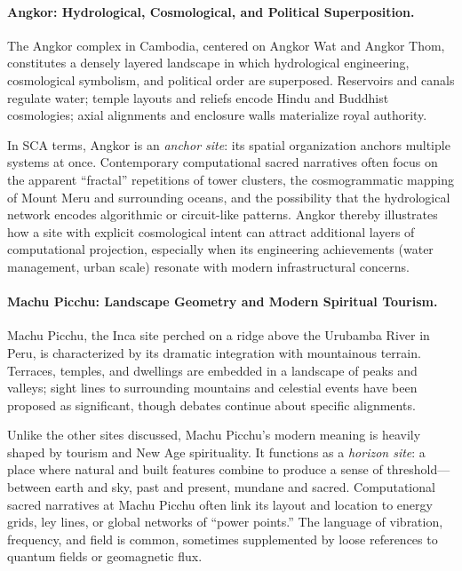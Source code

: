 \documentclass[12]{amsart}
\theoremstyle{plain}
\begin{document}
\paragraph{Angkor: Hydrological, Cosmological, and Political Superposition.}

The Angkor complex in Cambodia, centered on Angkor Wat and Angkor Thom, constitutes a densely layered landscape in which hydrological engineering, cosmological symbolism, and political order are superposed. Reservoirs and canals regulate water; temple layouts and reliefs encode Hindu and Buddhist cosmologies; axial alignments and enclosure walls materialize royal authority.

In SCA terms, Angkor is an \emph{anchor site}: its spatial organization anchors multiple systems at once. Contemporary computational sacred narratives often focus on the apparent ``fractal'' repetitions of tower clusters, the cosmogrammatic mapping of Mount Meru and surrounding oceans, and the possibility that the hydrological network encodes algorithmic or circuit-like patterns. Angkor thereby illustrates how a site with explicit cosmological intent can attract additional layers of computational projection, especially when its engineering achievements (water management, urban scale) resonate with modern infrastructural concerns.

\paragraph{Machu Picchu: Landscape Geometry and Modern Spiritual Tourism.}

Machu Picchu, the Inca site perched on a ridge above the Urubamba River in Peru, is characterized by its dramatic integration with mountainous terrain. Terraces, temples, and dwellings are embedded in a landscape of peaks and valleys; sight lines to surrounding mountains and celestial events have been proposed as significant, though debates continue about specific alignments.

Unlike the other sites discussed, Machu Picchu's modern meaning is heavily shaped by tourism and New Age spirituality. It functions as a \emph{horizon site}: a place where natural and built features combine to produce a sense of threshold—between earth and sky, past and present, mundane and sacred. Computational sacred narratives at Machu Picchu often link its layout and location to energy grids, ley lines, or global networks of ``power points.'' The language of vibration, frequency, and field is common, sometimes supplemented by loose references to quantum fields or geomagnetic flux.
\end{document}
